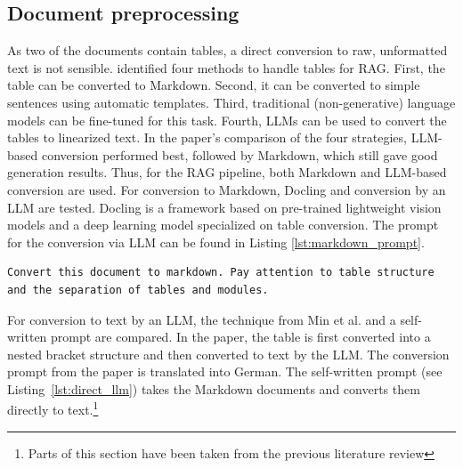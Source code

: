 \documentclass[12pt]{article} %
\begin{document}
\subsection{Document preprocessing}
As two of the documents contain tables, a direct conversion to raw, unformatted text is not sensible. \textcite{min2024exploring} identified four methods to handle tables for RAG. First, the table can be converted to Markdown. Second, it can be converted to simple sentences using automatic templates.
Third, traditional (non-generative) language models can be fine-tuned for this task. Fourth, LLMs can be used to convert the tables to linearized text. In the paper's comparison of the four strategies, LLM-based conversion performed best, followed by Markdown, which still gave good generation results.
Thus, for the RAG pipeline, both Markdown and LLM-based conversion are used. For conversion to Markdown, Docling \parencite{Docling} and conversion by an LLM are tested. Docling is a framework based on pre-trained lightweight vision models and a deep learning model specialized on table conversion. The prompt for the conversion via LLM can be found in Listing \ref{lst:markdown_prompt}. \\
\begin{lstlisting}[breaklines=true, basicstyle=\ttfamily,caption={Prompt for conversion to Markdown}, label=lst:markdown_prompt]
Convert this document to markdown. Pay attention to table structure and the separation of tables and modules.
\end{lstlisting}
For conversion to text by an LLM, the technique from Min et al. and a self-written prompt are compared. In the paper, the table is first converted into a nested bracket structure and then converted to text by the LLM. The conversion prompt from the paper is translated into German. The self-written prompt (see Listing~\ref{lst:direct_llm}) takes the Markdown documents and converts them directly to text.\footnote{Parts of this section have been taken from the previous literature review}
\end{document}
